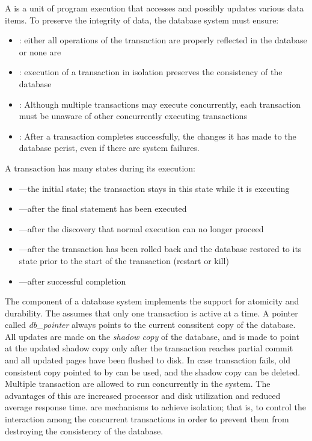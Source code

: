 \documentclass{article}
\begin{document}
A  is a unit of program execution that accesses and possibly updates various data items. To preserve the integrity of data, the database system must ensure:
\begin{itemize}
  \item {}: either all operations of the transaction are properly reflected in the database or none are
  \item {}: execution of a transaction in isolation preserves the consistency of the database
  \item {}: Although multiple transactions may execute concurrently, each transaction must be unaware of other concurrently executing transactions
  \item {}: After a transaction completes successfully, the changes it has made to the database perist, even if there are system failures. 
\end{itemize}
A transaction has many states during its execution: 
\begin{itemize}
  \item {}---the initial state; the transaction stays in this state while it is executing 
  \item {}---after the final statement has been executed 
  \item {}---after the discovery that normal execution can no longer proceed 
  \item {}---after the transaction has been rolled back and the database restored to its state prior to the start of the transaction (restart or kill) 
  \item {}---after successful completion
\end{itemize}
The  component of a database system implements the support for atomicity and durability. The  assumes that only one transaction is active at a time. A pointer called \emph{db\_pointer} always points to the current conssitent copy of the database. All updates are made on the \emph{shadow copy} of the database, and  is made to point at the updated shadow copy only after the transaction reaches partial commit and all updated pages have been flushed to disk. In case transaction fails, old consistent copy pointed to by  can be used, and the shadow copy can be deleted. \\ 

Multiple transaction are allowed to run concurrently in the system. The advantages of this are increased processor and disk utilization and reduced average response time.  are mechanisms to achieve isolation; that is, to control the interaction among the concurrent transactions in order to prevent them from destroying the consistency of the database. \\ 
\end{document}
